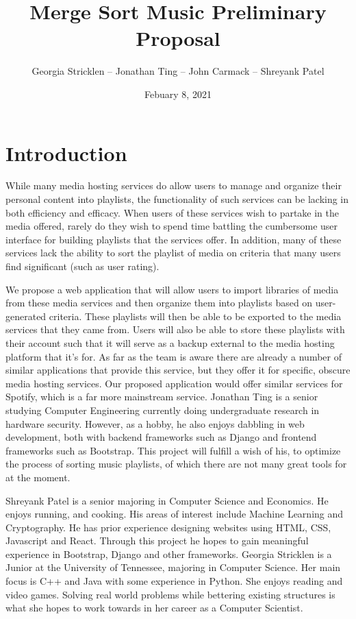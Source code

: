 \documentclass{article}
\title{Merge Sort Music Preliminary Proposal}
\author{Georgia Stricklen -- Jonathan Ting -- John Carmack -- Shreyank Patel}
\date{Febuary 8, 2021}
\begin{document}
\maketitle

\section{Introduction}  
  
While many media hosting services do allow users to manage and organize their personal content into playlists, the functionality of such services can be lacking in both efficiency and efficacy. 
When users of these services wish to partake in the media offered, rarely do they wish to spend time battling the cumbersome user interface for building playlists that the services offer. In addition, many of these services lack the ability to sort the playlist of media on criteria that many users find significant (such as user rating).   

We propose a web application that will allow users to import libraries of media from these media services and then organize them into playlists based on user-generated criteria. These playlists will then be able to be exported to the media services that they came from. Users will also be able to store these playlists with their account such that it will serve as a backup external to the media hosting platform that it’s for. As far as the team is aware there are already a number of similar applications that provide this service, but they offer it for specific, obscure media hosting services. Our proposed application would offer similar services for Spotify, which is a far more mainstream service.  
Jonathan Ting is a senior studying Computer Engineering currently doing undergraduate research in hardware security. However, as a hobby, he also enjoys dabbling in web development, both with backend frameworks such as Django and frontend frameworks such as Bootstrap. This project will fulfill a wish of his, to optimize the process of sorting music playlists, of which there are not many great tools for at the moment.  

Shreyank Patel is a senior majoring in Computer Science and Economics. He enjoys running, and cooking. His areas of interest include Machine Learning and Cryptography. He has prior experience designing websites using HTML, CSS, Javascript and React. Through this project he hopes to gain meaningful experience in Bootstrap, Django and other frameworks.
Georgia Stricklen is a Junior at the University of Tennessee, majoring in Computer Science. Her main focus is C++ and Java with some experience in Python. She enjoys reading and video games. Solving real world problems while bettering existing structures is what she hopes to work towards in her career as a Computer Scientist. 
\end{document}

